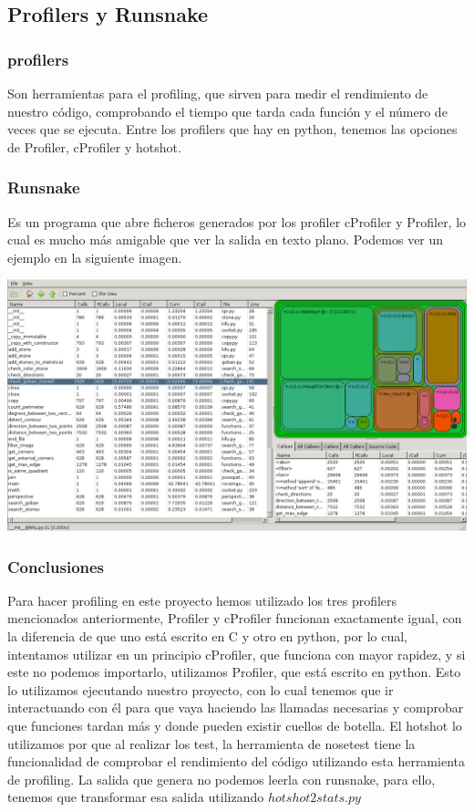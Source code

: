 \documentclass[12pt,a4paper]{report}
\begin{document}
\subsection{Profilers y Runsnake}

\subsubsection{profilers} 

Son herramientas para el profiling, que sirven para medir el rendimiento de
nuestro código, comprobando el tiempo que tarda cada función y el número de
veces que se ejecuta. Entre los profilers que hay en python, tenemos las
opciones de Profiler, cProfiler y hotshot.


\subsubsection{Runsnake} 

Es un programa que abre ficheros generados por los profiler cProfiler y
Profiler, lo cual es mucho más amigable que ver la salida en texto plano.
Podemos ver un ejemplo en la siguiente imagen. 

\includegraphics[scale=0.33]{runsnake.png}

\subsubsection{Conclusiones}

Para hacer profiling en este proyecto hemos utilizado los tres profilers
mencionados anteriormente, Profiler y cProfiler funcionan exactamente igual, con
la diferencia de que uno está escrito en C y otro en python, por lo cual,
intentamos utilizar en un principio cProfiler, que funciona con mayor rapidez, y
si este no podemos importarlo, utilizamos Profiler, que está escrito en
python. Esto lo utilizamos ejecutando nuestro proyecto, con lo cual tenemos que
ir interactuando con él para que vaya haciendo las llamadas necesarias y
comprobar que funciones tardan más y donde pueden existir cuellos de botella. 
El hotshot lo utilizamos por que al realizar los test, la herramienta de
nosetest tiene la funcionalidad de comprobar el rendimiento del código
utilizando esta herramienta de profiling. La salida que genera no podemos leerla
con runsnake, para ello, tenemos que transformar esa salida utilizando
$hotshot2stats.py$
\end{document}
